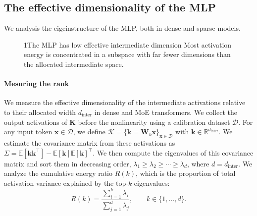 \documentclass{article} %
\begin{document}
\subsection{The effective dimensionality of the MLP}
\label{sec:rank_observations}
We analysis the eigeinstructure of the MLP, both in dense and sparse models.

\begin{figure}
\begin{observationbox}{1}{The MLP has low effective intermediate dimension}
Most activation energy is concentrated in a subspace with far fewer dimensions than the allocated intermediate space.
\end{observationbox}
\end{figure}
\paragraph{Mesuring the rank} We measure the effective dimensionality of the intermediate activations relative to their allocated width
$d_{\text{inter}}$ in dense and MoE transformers.
We collect the output activations of $\textbf{K}$ before the nonlinearity using a calibration dataset $\mathcal{D}$.
For any input token $\mathbf{x} \in \mathcal{D}$, we define 
$\mathcal{K} = \{ \mathbf{k} = \textbf{W}_{k} \mathbf{x} \}_{\mathbf{x} \in \mathcal{D}}$ with $\mathbf{k} \in \mathbb{R}^{d_{\text{inter}} }$.
We estimate the covariance matrix from these activations as
$\Sigma = \mathbb{E}[\mathbf{k}\mathbf{k}^\top] - \mathbb{E}[\mathbf{k}]\mathbb{E}[\mathbf{k}]^\top$.
We then compute the eigenvalues of this covariance matrix and sort
them in decreasing order, $\lambda_1 \geq \lambda_2 \geq \cdots \geq
\lambda_d$, where $d=d_{\text{inter}}$. We analyze the cumulative energy ratio $R(k)$, which is the
proportion of total activation variance explained by the top-$k$ eigenvalues:
\[
    R(k) = \frac{\sum_{i=1}^{k} \lambda_i}{\sum_{j=1}^{d} \lambda_j},
    \qquad k \in \{1,\ldots,d\}.
\]
\end{document}
